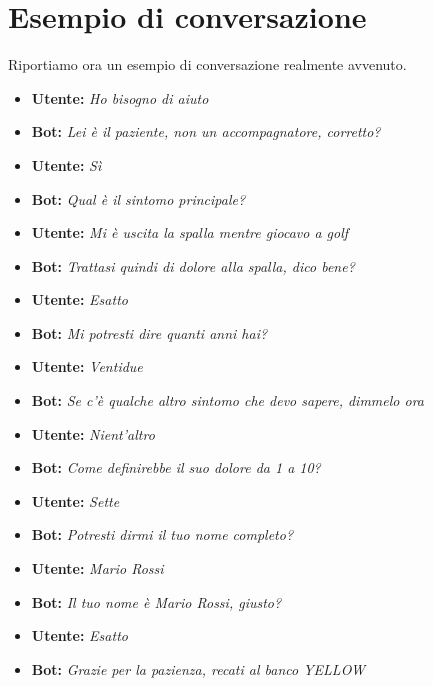 \section{Esempio di conversazione}
Riportiamo ora un esempio di conversazione realmente avvenuto.
\begin{itemize}
    \item \textbf{Utente:} \textit{Ho bisogno di aiuto}
    \item \textbf{Bot:} \textit{Lei è il paziente, non un accompagnatore, corretto?}
    \item \textbf{Utente:} \textit{Sì}
    \item \textbf{Bot:} \textit{Qual è il sintomo principale?}
    \item \textbf{Utente:} \textit{Mi è uscita la spalla mentre giocavo a golf}
    \item \textbf{Bot:} \textit{Trattasi quindi di dolore alla spalla, dico bene?}
    \item \textbf{Utente:} \textit{Esatto}
    \item \textbf{Bot:} \textit{Mi potresti dire quanti anni hai?}
    \item \textbf{Utente:} \textit{Ventidue}
    \item \textbf{Bot:} \textit{Se c'è qualche altro sintomo che devo sapere, dimmelo ora}
    \item \textbf{Utente:} \textit{Nient'altro}
    \item \textbf{Bot:} \textit{Come definirebbe il suo dolore da 1 a 10?}
    \item \textbf{Utente:} \textit{Sette}
    \item \textbf{Bot:} \textit{Potresti dirmi il tuo nome completo?}
    \item \textbf{Utente:} \textit{Mario Rossi}
    \item \textbf{Bot:} \textit{Il tuo nome è Mario Rossi, giusto?}
    \item \textbf{Utente:} \textit{Esatto}
    \item \textbf{Bot:} \textit{Grazie per la pazienza, recati al banco YELLOW}
\end{itemize}